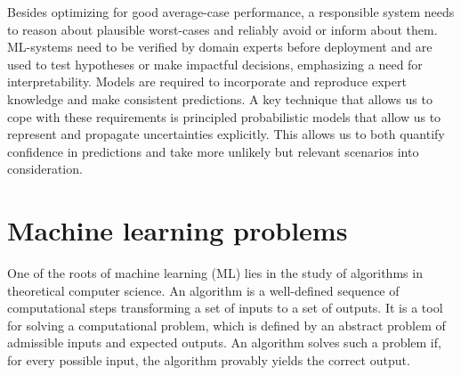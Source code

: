 Besides optimizing for good average-case performance, a responsible system needs to reason about plausible worst-cases and reliably avoid or inform about them.
ML-systems need to be verified by domain experts before deployment and are used to test hypotheses or make impactful decisions, emphasizing a need for interpretability.
Models are required to incorporate and reproduce expert knowledge and make consistent predictions.
A key technique that allows us to cope with these requirements is principled probabilistic models that allow us to represent and propagate uncertainties explicitly.
This allows us to both quantify confidence in predictions and take more unlikely but relevant scenarios into consideration.




\section{Machine learning problems}
\label{toc:bayesian_ml:ml_problems}
One of the roots of machine learning (ML) lies in the study of algorithms in theoretical computer science.
An algorithm is a well-defined sequence of computational steps transforming a set of inputs to a set of outputs.
It is a tool for solving a computational problem, which is defined by an abstract problem of admissible inputs and expected outputs.
An algorithm solves such a problem if, for every possible input, the algorithm provably yields the correct output.


